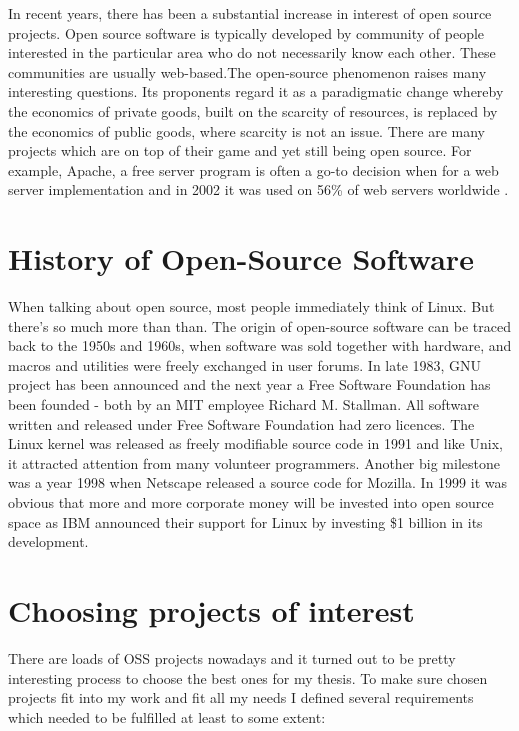 In recent years, there has been a substantial increase in interest of open source projects. Open source software is typically developed by community of people interested in the particular area who do not necessarily know each other. These communities are usually web-based.The open-source phenomenon raises many interesting questions. Its proponents regard it as a paradigmatic change whereby the economics of private goods, built on the scarcity of resources, is replaced by the economics of public goods, where scarcity is not an issue. \cite{alexander2002working} There are many projects which are on top of their game and yet still being open source. For example, Apache, a free server program is often a go-to decision when for a web server implementation and in 2002 it was used on 56\% of web servers worldwide \cite{lerner2001open}.

\section{History of Open-Source Software}
When talking about open source, most people immediately think of Linux. But there's so much more than than. The origin of open-source software can be traced back to the 1950s and 1960s, when software was sold together with hardware, and macros and utilities were freely exchanged in user forums. \cite{alexander2002working} In late 1983, GNU project has been announced and the next year a Free Software Foundation has been founded - both by an MIT employee Richard M. Stallman. All software written and released under Free Software Foundation had zero licences. The Linux kernel was released as freely modifiable source code in 1991 and like Unix, it attracted attention from many volunteer programmers. Another big milestone was a year 1998 when Netscape released a source code for Mozilla. In 1999 it was obvious that more and more corporate money will be invested into open source space as IBM announced their support for Linux by investing \$1 billion in its development.

\section{Choosing projects of interest}
There are loads of OSS projects nowadays and it turned out to be pretty interesting process to choose the best ones for my thesis. To make sure chosen projects fit into my work and fit  all my needs I defined several requirements which needed to be fulfilled at least to some extent:

